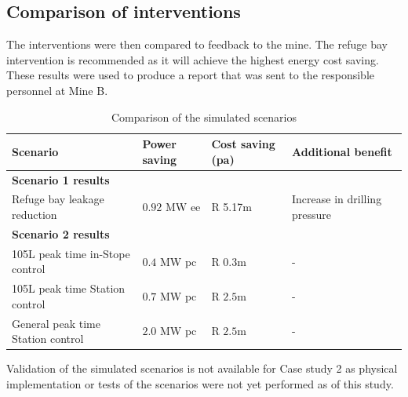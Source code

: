 	\subsection{Comparison of interventions}
	The interventions were then compared to feedback to the mine. The refuge bay intervention is recommended as it will achieve the highest energy cost saving. These results were used to produce a report that was sent to the responsible personnel at Mine B.
	\begin{table}[h!]
		\centering
		\begin{tabular}{p{}
				p{}
				p{}
				p{}}
			\hline 
			 \vspace{0.5em}Scenario & \vspace{0.5em}Power saving & Cost saving (\gls{pa}) & \vspace{0.5em}Additional benefit \\
			\hline
			\multicolumn{4}{l}{\textbf{Scenario 1 results}} \\
			Refuge bay leakage reduction & $ 0.92 $ MW \gls{ee} & R 5.17m & Increase in drilling pressure \\
			 
			\multicolumn{4}{l}{\textbf{Scenario 2 results}} \\
			105L peak time in-Stope control & $ 0.4 $ MW \gls{pc} & R $ 0.3 $m& - \\
			105L peak time Station control & $ 0.7 $ MW \gls{pc} & R $ 2.5 $m& - \\
			General peak time Station control & $ 2.0 $ MW \gls{pc} & R $ 2.5 $m& - \\
			\hline 
		\end{tabular}
		\caption{Comparison of the simulated scenarios}
		\label{Table: B Comparison}
	\end{table}
\par
Validation of the simulated scenarios is not available for Case study 2 as physical implementation or tests of the scenarios were not yet performed as of this study.
